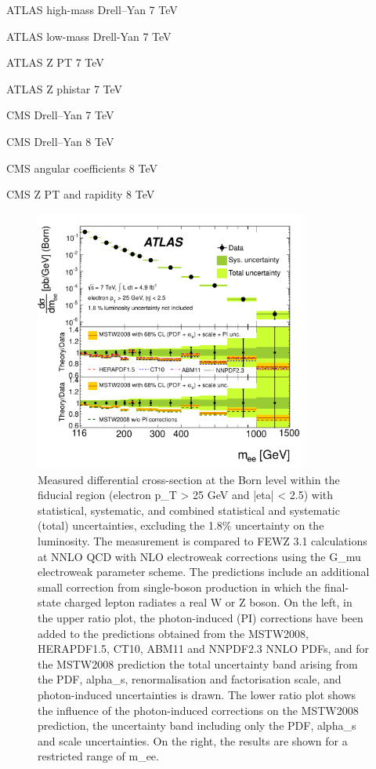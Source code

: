 ATLAS high-mass Drell--Yan 7 TeV~\cite{Aad:2013iua} 

ATLAS low-mass Drell-Yan 7 TeV~\cite{Aad:2014qja}

ATLAS Z PT 7 TeV~\cite{Aad:2014xaa}

ATLAS Z phistar 7 TeV~\cite{Aad:2012wfa}

CMS Drell--Yan 7 TeV~\cite{Chatrchyan:2013tia}

CMS Drell--Yan 8 TeV~\cite{CMS:2014jea}

CMS angular coefficients 8 TeV~\cite{Khachatryan:2015paa}

CMS Z PT and rapidity 8 TeV~\cite{Khachatryan:2015oaa}

\begin{figure}[p]
    \centering
    \includegraphics[width=0.8\textwidth]{atlas_drellyan7tev}
    \caption{Measured differential cross-section at the Born level within the fiducial region (electron p_T > 25 GeV and |eta| < 2.5) with statistical, systematic, and combined statistical and systematic (total) uncertainties, excluding the 1.8\% uncertainty on the luminosity. The measurement is compared to FEWZ 3.1 calculations at NNLO QCD with NLO electroweak corrections using the G_mu electroweak parameter scheme. The predictions include an additional small correction from single-boson production in which the final-state charged lepton radiates a real W or Z boson. On the left, in the upper ratio plot, the photon-induced (PI) corrections have been added to the predictions obtained from the MSTW2008, HERAPDF1.5, CT10, ABM11 and NNPDF2.3 NNLO PDFs, and for the MSTW2008 prediction the total uncertainty band arising from the PDF, alpha_s, renormalisation and factorisation scale, and photon-induced uncertainties is drawn. The lower ratio plot shows the influence of the photon-induced corrections on the MSTW2008 prediction, the uncertainty band including only the PDF, alpha_s and scale uncertainties. On the right, the results are shown for a restricted range of m_ee.}
    \label{fig:atlas_drellyan7tev}
\end{figure}

